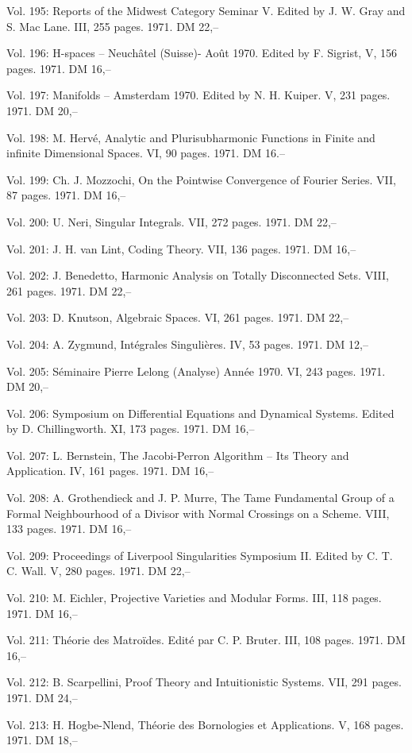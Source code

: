 Vol. 195: Reports of the Midwest Category Seminar V. Edited by J. W. Gray and S. Mac Lane. III, 255 pages. 1971. DM 22,--

Vol. 196: H-spaces -- Neuchâtel (Suisse)- Août 1970. Edited by F. Sigrist, V, 156 pages. 1971. DM 16,--

Vol. 197: Manifolds -- Amsterdam 1970. Edited by N. H. Kuiper. V, 231 pages. 1971. DM 20,--

Vol. 198: M. Hervé, Analytic and Plurisubharmonic Functions in Finite and infinite Dimensional Spaces. VI, 90 pages. 1971. DM 16.--

Vol. 199: Ch. J. Mozzochi, On the Pointwise Convergence of Fourier Series. VII, 87 pages. 1971. DM 16,--

Vol. 200: U. Neri, Singular Integrals. VII, 272 pages. 1971. DM 22,--

Vol. 201: J. H. van Lint, Coding Theory. VII, 136 pages. 1971. DM 16,--

Vol. 202: J. Benedetto, Harmonic Analysis on Totally Disconnected Sets. VIII, 261 pages. 1971. DM 22,--

Vol. 203: D. Knutson, Algebraic Spaces. VI, 261 pages. 1971. DM 22,--

Vol. 204: A. Zygmund, Intégrales Singulières. IV, 53 pages. 1971. DM 12,--

Vol. 205: Séminaire Pierre Lelong (Analyse) Année 1970. VI, 243 pages. 1971. DM 20,--

Vol. 206: Symposium on Differential Equations and Dynamical Systems. Edited by D. Chillingworth. XI, 173 pages. 1971. DM 16,--

Vol. 207: L. Bernstein, The Jacobi-Perron Algorithm -- Its Theory and Application. IV, 161 pages. 1971. DM 16,--

Vol. 208: A. Grothendieck and J. P. Murre, The Tame Fundamental Group of a Formal Neighbourhood of a Divisor with Normal Crossings on a Scheme. VIII, 133 pages. 1971. DM 16,--

Vol. 209: Proceedings of Liverpool Singularities Symposium II. Edited by C. T. C. Wall. V, 280 pages. 1971. DM 22,--

Vol. 210: M. Eichler, Projective Varieties and Modular Forms. III, 118 pages. 1971. DM 16,--

Vol. 211: Théorie des Matroïdes. Edité par C. P. Bruter. III, 108 pages. 1971. DM 16,--

Vol. 212: B. Scarpellini, Proof Theory and Intuitionistic Systems. VII, 291 pages. 1971. DM 24,--

Vol. 213: H. Hogbe-Nlend, Théorie des Bornologies et Applications. V, 168 pages. 1971. DM 18,--

